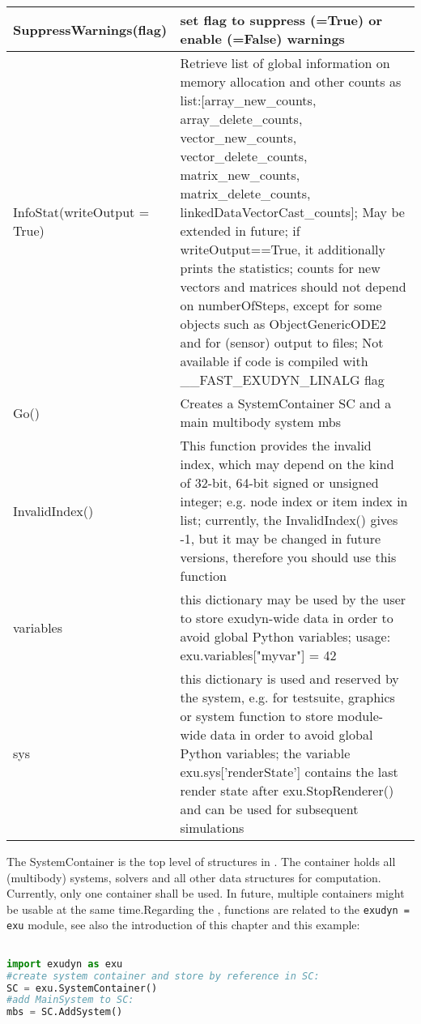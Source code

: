 \begin{center}
\begin{longtable}{| p{8cm} | p{8cm} |}
  SuppressWarnings(flag) & set flag to suppress (=True) or enable (=False) warnings\\ \hline 
  InfoStat(writeOutput = True) & Retrieve list of global information on memory allocation and other counts as list:[array\_new\_counts, array\_delete\_counts, vector\_new\_counts, vector\_delete\_counts, matrix\_new\_counts, matrix\_delete\_counts, linkedDataVectorCast\_counts]; May be extended in future; if writeOutput==True, it additionally prints the statistics; counts for new vectors and matrices should not depend on numberOfSteps, except for some objects such as ObjectGenericODE2 and for (sensor) output to files; Not available if code is compiled with \_\_FAST\_EXUDYN\_LINALG flag\\ \hline 
  Go() & Creates a SystemContainer SC and a main multibody system mbs\\ \hline 
  InvalidIndex() & This function provides the invalid index, which may depend on the kind of 32-bit, 64-bit signed or unsigned integer; e.g. node index or item index in list; currently, the InvalidIndex() gives -1, but it may be changed in future versions, therefore you should use this function\\ \hline 
  variables & this dictionary may be used by the user to store exudyn-wide data in order to avoid global Python variables; usage: exu.variables["myvar"] = 42 \\ \hline  
  sys & this dictionary is used and reserved by the system, e.g. for testsuite, graphics or system function to store module-wide data in order to avoid global Python variables; the variable exu.sys['renderState'] contains the last render state after exu.StopRenderer() and can be used for subsequent simulations \\ \hline  
\end{longtable}
\end{center}




The SystemContainer is the top level of structures in \codeName. The container holds all (multibody) systems, solvers and all other data structures for computation. Currently, only one container shall be used. In future, multiple containers might be usable at the same time.Regarding the , functions are related to the \texttt{exudyn = exu} module, see also the introduction of this chapter and this example:
\pythonstyle
\begin{lstlisting}[language=Python, firstnumber=1]

import exudyn as exu
#create system container and store by reference in SC:
SC = exu.SystemContainer() 
#add MainSystem to SC:
mbs = SC.AddSystem()
\end{lstlisting}

